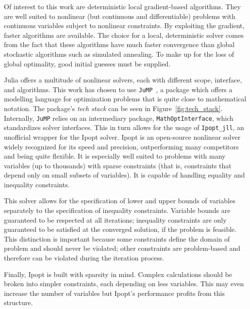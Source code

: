 Of interest to this work are deterministic local gradient-based algorithms. They are well suited to nonlinear (but continuous and differentiable) problems with continuous variables subject to nonlinear constraints. By exploiting the gradient, faster algorithms are available. The choice for a local, deterministic solver comes from the fact that these algorithms have much faster convergence than global stochastic algorithms such as simulated annealing. To make up for the loss of global optimality, good initial guesses must be supplied.

Julia offers a multitude of nonlinear solvers, each with different scope, interface, and algorithms. This work has chosen to use \texttt{JuMP}~\cite{jump}, a package which offers a modelling language for optimization problems that is quite close to mathematical notation. The package's \textit{tech stack} can be seen in Figure~\ref{fig:tech_stack}. Internally, \texttt{JuMP} relies on an intermediary package, \texttt{MathOptInterface}, which standardizes solver interfaces. This in turn allows for the usage of \texttt{Ipopt\_jll}, an unofficial wrapper for the Ipopt solver. Ipopt is an open-source nonlinear solver widely recognized for its speed and precision, outperforming many competitors and being quite flexible. It is especially well suited to problems with many variables (up to thousands) with sparse constraints (that is, constraints that depend only on small subsets of variables). It is capable of handling equality and inequality constraints.

This solver allows for the specification of lower and upper bounds of variables separately to the specification of inequality constraints. Variable bounds are guaranteed to be respected at all iterations; inequality constraints are only guaranteed to be satisfied at the converged solution, if the problem is feasible. This distinction is important because some constraints define the domain of problem and should never be violated; other constraints are problem-based and therefore can be violated during the iteration process.

Finally, Ipopt is built with sparsity in mind. Complex calculations should be broken into simpler constraints, each depending on less variables. This may even increase the number of variables but Ipopt's performance profits from this structure.

